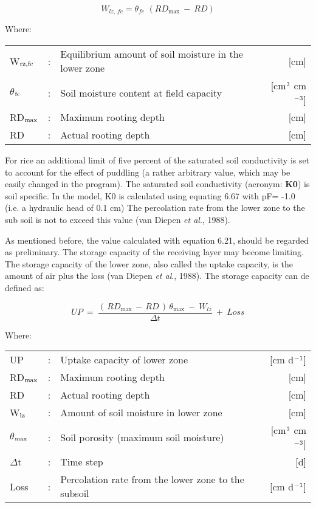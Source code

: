 \begin{equation}
W_{lz,\, fc} = \theta_{fc} \,\, (RD_{\max} ~-~RD)
\end{equation}

Where:\\[5pt]
\begin{tabularx}{\textwidth}{llXr}
W$_{{\rm rz,fc}}$ &:& Equilibrium amount of soil moisture in the lower zone  & [cm]\\
$\theta$$_{{\rm fc}}$ &:& Soil moisture content at field capacity  & [cm$^{{\rm 3}}$ cm$^{{\rm -3}}$]\\
RD$_{{\rm max}}$ &:& Maximum rooting depth  & [cm]\\
RD &:& Actual rooting depth  & [cm]\\
\end{tabularx}

For rice an additional limit of five percent of the saturated soil conductivity is set to
account for the effect of puddling (a rather arbitrary value, which may be easily changed
in the program). The saturated soil conductivity (acronym: {\bf K0}) is soil specific. In the
model, K0 is calculated using equating 6.67 with pF= -1.0 (i.e. a hydraulic head of 0.1
cm) The percolation rate from the lower zone to the sub soil is not to exceed this value
(van Diepen {\it et al}., 1988). 

As mentioned before, the value calculated with equation 6.21, should be regarded as
preliminary. The storage capacity of the receiving layer may become limiting. The
storage capacity of the lower zone, also called the uptake capacity, is the amount of air
plus the loss (van Diepen {\it et al}., 1988). The storage capacity can de defined as:

\begin{equation}
UP  ~=~{\frac{(\, RD _{\max } \, -\, RD\, )\, \theta  _{\max } ~-~ W _{lz} }{\Delta t}} ~+~ Loss
\end{equation}

Where:\\[5pt]
\begin{tabularx}{\textwidth}{llXr}
UP &:& Uptake capacity of lower zone  & [cm d$^{{\rm -1}}$]\\
RD$_{{\rm max}}$ &:& Maximum rooting depth  & [cm]\\
RD &:& Actual rooting depth  & [cm]\\
W$_{{\rm lz}}$ &:& Amount of soil moisture in lower zone  & [cm]\\
$\theta$$_{{\rm max}}$ &:& Soil porosity (maximum soil moisture)  & [cm$^{{\rm 3}}$ cm$^{{\rm -3}}$]\\
$\Delta$t &:& Time step  & [d]\\
Loss &:& Percolation rate from the lower zone to the subsoil   & [cm d$^{{\rm -1}}$]\\
\end{tabularx}


